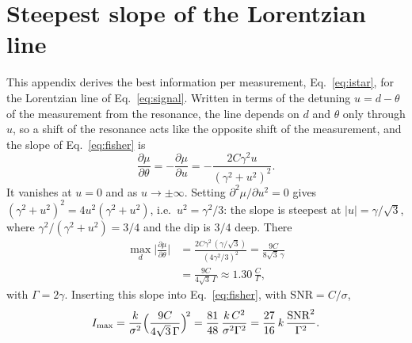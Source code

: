 \section{Steepest slope of the Lorentzian line}
\label{app:fisher}

This appendix derives the best information per measurement, Eq.~\eqref{eq:istar}, for the Lorentzian line of
Eq.~\eqref{eq:signal}. Written in terms of the detuning $u=d-\theta$ of the measurement from the resonance, the
line depends on $d$ and $\theta$ only through $u$, so a shift of the resonance acts like the opposite shift of the
measurement, and the slope of Eq.~\eqref{eq:fisher} is
\begin{equation*}
  \frac{\partial\mu}{\partial\theta}=-\frac{\partial\mu}{\partial u}=-\frac{2C\gamma^2u}{(\gamma^2+u^2)^2}.
\end{equation*}
It vanishes at $u=0$ and as $u\to\pm\infty$. Setting $\partial^2\mu/\partial u^2=0$ gives
$(\gamma^2+u^2)^2=4u^2(\gamma^2+u^2)$, i.e.\ $u^2=\gamma^2/3$: the slope is steepest at $|u|=\gamma/\sqrt3$, where
$\gamma^2/(\gamma^2+u^2)=3/4$ and the dip is $3/4$ deep. There
\begin{equation*}
  \begin{aligned}
  \max_d\Big|\frac{\partial\mu}{\partial\theta}\Big|&=\frac{2C\gamma^2\,(\gamma/\sqrt3)}{(4\gamma^2/3)^2}=\frac{9C}{8\sqrt3\,\gamma}\\
  &=\frac{9C}{4\sqrt3\,\Gamma}\approx1.30\,\frac{C}{\Gamma},
  \end{aligned}
\end{equation*}
with $\Gamma=2\gamma$. Inserting this slope into Eq.~\eqref{eq:fisher}, with $\mathrm{SNR}=C/\sigma$,
\begin{equation*}
  I_{\rm max}=\frac{k}{\sigma^2}\Big(\frac{9C}{4\sqrt3\,\Gamma}\Big)^{\!2}=\frac{81}{48}\,\frac{k\,C^2}{\sigma^2\Gamma^2}
  =\frac{27}{16}\,k\,\frac{\mathrm{SNR}^2}{\Gamma^2}.
\end{equation*}
